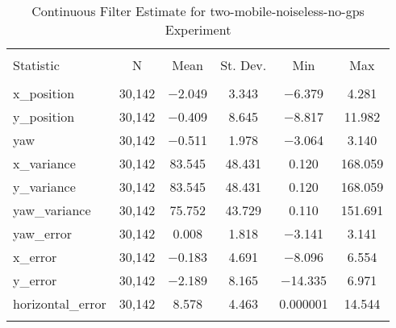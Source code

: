 
\begin{table}[h] \centering 
  \caption{Continuous Filter Estimate for two-mobile-noiseless-no-gps Experiment} 
  \label{tab:two_mobile_noiseless_no_gps_continuous_summary} 
\begin{tabular}{@{\extracolsep{5pt}}lccccc} 
\\[-1.8ex]\hline 
\hline \\[-1.8ex] 
Statistic & \multicolumn{1}{c}{N} & \multicolumn{1}{c}{Mean} & \multicolumn{1}{c}{St. Dev.} & \multicolumn{1}{c}{Min} & \multicolumn{1}{c}{Max} \\ 
\hline \\[-1.8ex] 
x\_position & 30,142 & $-$2.049 & \num{3.343} & $-$6.379 & \num{4.281} \\ 
y\_position & 30,142 & $-$0.409 & \num{8.645} & $-$8.817 & \num{11.982} \\ 
yaw & 30,142 & $-$0.511 & \num{1.978} & $-$3.064 & \num{3.140} \\ 
x\_variance & 30,142 & \num{83.545} & \num{48.431} & \num{0.120} & \num{168.059} \\ 
y\_variance & 30,142 & \num{83.545} & \num{48.431} & \num{0.120} & \num{168.059} \\ 
yaw\_variance & 30,142 & \num{75.752} & \num{43.729} & \num{0.110} & \num{151.691} \\ 
yaw\_error & 30,142 & \num{0.008} & \num{1.818} & $-$3.141 & \num{3.141} \\ 
x\_error & 30,142 & $-$0.183 & \num{4.691} & $-$8.096 & \num{6.554} \\ 
y\_error & 30,142 & $-$2.189 & \num{8.165} & $-$14.335 & \num{6.971} \\ 
horizontal\_error & 30,142 & \num{8.578} & \num{4.463} & \num{0.000001} & \num{14.544} \\ 
\hline \\[-1.8ex] 
\end{tabular} 
\end{table} 

